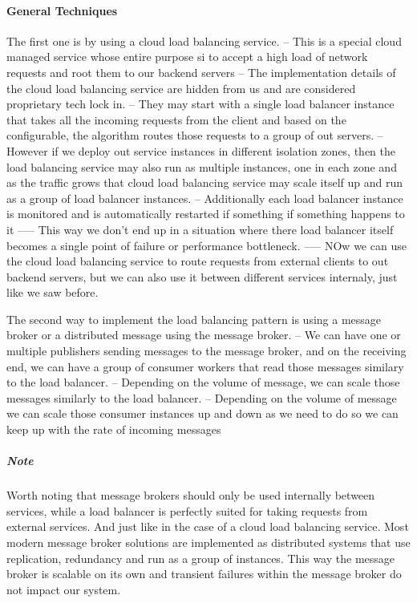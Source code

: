 \documentclass[a4paper, 11pt]{book}
\begin{document}
{    \paragraph{General Techniques}
    The first one is by using a cloud load balancing service.
    -- This is a special cloud managed service whose entire purpose si to accept a high load of network requests and root them to our backend servers
    -- The implementation details of the cloud load balancing service are hidden from us and are considered proprietary tech lock in.
    -- They may start with a single load balancer instance that takes all the incoming requests from the client and based on the configurable, the algorithm routes those requests to a group of out servers.
    -- However if we deploy out service instances in different isolation zones, then the load balancing service may also run as multiple instances, one in each zone and as the traffic grows that cloud load balancing service may scale itself up and run as a group of load balancer instances.
    -- Additionally each load balancer instance is monitored and is automatically restarted if something if something happens to it
    ----- This way we don't end up in a situation where there load balancer itself becomes a single point of failure or performance bottleneck.
    ----- NOw we can use the cloud load balancing service to route requests from external clients to out backend servers, but we can also use it between different services internaly, just like we saw before.

    The second way to implement the load balancing pattern is using a message broker or a distributed message using the message broker.
    -- We can have one or multiple publishers sending messages to the message broker, and on the receiving end, we can have a group of consumer workers that read those messages similary to the load balancer.
    -- Depending on the volume of message, we can scale those messages similarly to the load balancer.
    -- Depending on the volume of message we can scale those consumer instances up and down as we need to do so we can keep up with the rate of incoming messages

    \subparagraph{Note} Worth noting that message brokers should only be used internally between services, while a load balancer is perfectly suited for taking requests from external services.
    And just like in the case of a cloud load balancing service.
    Most modern message broker solutions are implemented as distributed systems that use replication, redundancy and run as a group of instances.
    This way the message broker is scalable on its own and transient failures within the message broker do not impact our system.

}
\end{document}
